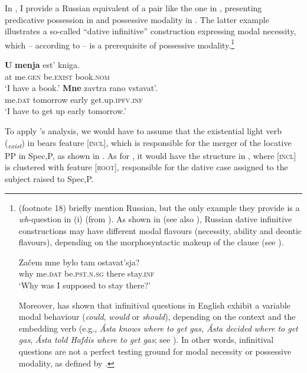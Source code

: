 \documentclass[output=paper,colorlinks,citecolor=brown,modfonts,nonflat]{langsci/langscibook}
\begin{document}
In , I provide a Russian equivalent of a pair like the one in , presenting predicative possession in  and possessive modality in . The latter example illustrates a so-called “dative infinitive” construction expressing modal necessity, which – according to \citeauthor{BjorkmanCowper2016} – is a prerequisite of possessive modality.\footnote{\citeauthor{BjorkmanCowper2016} (footnote 18) briefly mention Russian, but the only example they provide is a \textit{wh}{}-question in (i) (from \citealt[105]{Jung2011}). As shown in \citet{Tsedryk2018} (see also \citealt{Fortuin2007}), Russian dative infinitive constructions may have different modal flavours (necessity, ability and deontic flavours), depending on the morphosyntactic makeup of the clause (see ).

\ea%
    \gll    Začem  mne       bylo          tam     ostavat’sja?\\
            why     me.\textsc{dat}   be.\textsc{pst.n.sg}  there   stay.\textsc{inf}\\
    \glt    ‘Why was I supposed to stay there?’
\z

Moreover, \citet[ch. 4]{Bhatt2006} has shown that infinitival questions in English exhibit a variable modal behaviour (\textit{could}, \textit{would} or \textit{should}), depending on the context and the embedding verb (e.g., \textit{Ásta knows where to get gas, Ásta decided where to get gas}, \textit{Ásta told Hafdis where to get gas}; see \citealt[124]{Bhatt2006}). In other words, infinitival questions are not a perfect testing ground for modal necessity or possessive modality, as defined by \citeauthor{BjorkmanCowper2016}.}

\ea%
    \label{ex:tsedryk:6}
    \ea\label{ex:tsedryk:6a}
    \gll    \textbf{U}  \textbf{menja}     {est’}           {kniga}.\\
            at  me.\textsc{gen}   be.\textsc{exist}    book.\textsc{nom}\\
    \glt    ‘I have a book.’
    \ex\label{ex:tsedryk:6b}
    \gll    \textbf{{Mne}}      {zavtra}       {rano}   {vstavat’}.\\
            me.\textsc{dat}  tomorrow  early  get.up.\textsc{ipfv.inf}\\
    \glt    ‘I have to get up early tomorrow.’ \hfill \citep[ex. (20a)]{Tsedryk2018}
    \z
\z

To apply \citeauthor{BjorkmanCowper2016}’s analysis, we would have to assume that the existential light verb ({\liv}\textit{\textsubscript{exist}}) in  bears feature [\textsc{incl}], which is responsible for the merger of the locative PP in Spec,{\liv}P, as shown in . As for , it would have the structure in , where [\textsc{incl}] is clustered with feature [\textsc{root}], responsible for the dative case assigned to the subject raised to Spec,{\liv}P.
\end{document}
